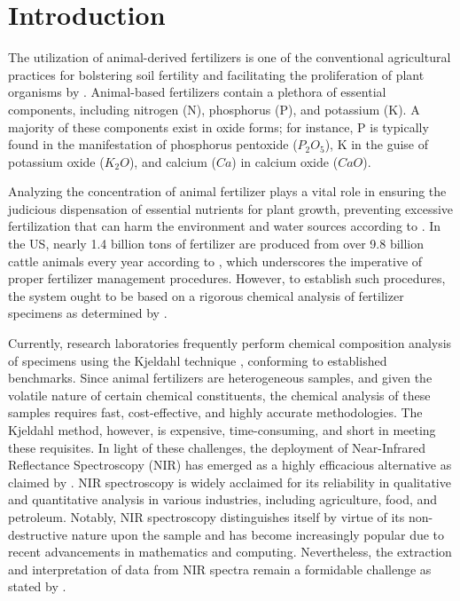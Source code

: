\documentclass[10pt, a4paper, oneside]{article}
\begin{document}
\section{Introduction}

The utilization of animal-derived fertilizers is one of the conventional agricultural practices for bolstering soil fertility and facilitating the proliferation of plant organisms by \cite{rahman2016effect}. Animal-based fertilizers contain a plethora of essential components, including nitrogen (N), phosphorus (P), and potassium (K). A majority of these components exist in oxide forms; for instance, P is typically found in the manifestation of phosphorus pentoxide (\(P_2O_5\)), K in the guise of potassium oxide (\(K_2 O\)), and calcium (\(Ca\)) in calcium oxide (\(CaO\)).

Analyzing the concentration of animal fertilizer plays a vital role in ensuring the judicious dispensation of essential nutrients for plant growth, preventing excessive fertilization that can harm the environment and water sources according to \cite{jiaying2022functions, macdonald2010manure}. In the US, nearly 1.4 billion tons of fertilizer are produced from over 9.8 billion cattle animals every year according to \cite{pagliari2020animal}, which underscores the imperative of proper fertilizer management procedures. However, to establish such procedures, the system ought to be based on a rigorous chemical analysis of fertilizer specimens as determined by \cite{kacprzak2023cycles}.

Currently, research laboratories frequently perform chemical composition analysis of specimens using the Kjeldahl technique \cite{fuquay2011encyclopedia}, conforming to established benchmarks. Since animal fertilizers are heterogeneous samples, and given the volatile nature of certain chemical constituents, the chemical analysis of these samples requires fast, cost-effective, and highly accurate methodologies. The Kjeldahl method, however, is expensive, time-consuming, and short in meeting these requisites. In light of these challenges, the deployment of Near-Infrared Reflectance Spectroscopy (NIR) has emerged as a highly efficacious alternative as claimed by \cite{feng2022evaluation}. NIR spectroscopy is widely acclaimed for its reliability in qualitative and quantitative analysis in various industries, including agriculture, food, and petroleum. Notably, NIR spectroscopy distinguishes itself by virtue of its non-destructive nature upon the sample and has become increasingly popular due to recent advancements in mathematics and computing. Nevertheless, the extraction and interpretation of data from NIR spectra remain a formidable challenge as stated by \cite{roggo2007review}.
\end{document}
